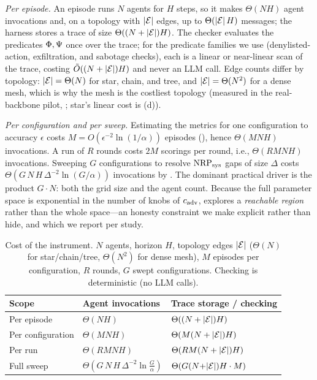 \emph{Per episode.} An episode runs $N$ agents for $H$ steps, so it makes $\Theta(NH)$ agent
invocations and, on a topology with $|\mathcal{E}|$ edges, up to $\Theta(|\mathcal{E}|\,H)$ messages; the
harness stores a trace of size $\Theta((N+|\mathcal{E}|)H)$. The checker evaluates the predicates
$\Phi,\Psi$ once over the trace; for the predicate families we use (denylisted-action,
exfiltration, and sabotage checks), each is a linear or near-linear scan of the trace, costing
$\tilde{O}((N+|\mathcal{E}|)H)$ and never an LLM call. Edge counts differ by topology:
$|\mathcal{E}|=\Theta(N)$ for star, chain, and tree, and $|\mathcal{E}|=\Theta(N^{2})$ for a dense mesh,
which is why the mesh is the costliest topology (measured in the real-backbone pilot,
; star's linear cost is (d)).

\emph{Per configuration and per sweep.} Estimating the metrics for one configuration to accuracy
$\epsilon$ costs $M=O(\epsilon^{-2}\ln(1/\alpha))$ episodes (), hence
$\Theta(MNH)$ invocations. A \corb{} run of $R$ rounds costs $2M$ scorings per round, i.e.,
$\Theta(RMNH)$ invocations. Sweeping $G$ configurations to resolve $\mathrm{NRP}_{\mathrm{sys}}$ gaps of size $\Delta$
costs $\Theta(G\,N\,H\,\Delta^{-2}\ln(G/\alpha))$ invocations by . The dominant
practical driver is the product $G\cdot N$: both the grid size and the agent count. Because the
full parameter space is exponential in the number of knobs of $c_{\mathrm{adv}}$, \corb{}
explores a \emph{reachable region} rather than the whole space---an honesty constraint we make
explicit rather than hide, and which we report per study.

\begin{table}[t]
\centering
\caption{Cost of the  instrument. $N$ agents, horizon $H$, topology edges $|\mathcal{E}|$
($\Theta(N)$ for star/chain/tree, $\Theta(N^2)$ for dense mesh), $M$ episodes per configuration,
$R$ \corb{} rounds, $G$ swept configurations. Checking is deterministic (no LLM calls).}
\label{tab:complexity}
\small
\begin{tabular}{@{}lll@{}}
\toprule
Scope & Agent invocations & Trace storage / checking \\
\midrule
Per episode        & $\Theta(NH)$        & $\Theta((N+|\mathcal{E}|)H)$ \\
Per configuration  & $\Theta(MNH)$       & $\Theta(M(N+|\mathcal{E}|)H)$ \\
Per \corb{} run    & $\Theta(RMNH)$      & $\Theta(RM(N+|\mathcal{E}|)H)$ \\
Full sweep         & $\Theta(G\,N\,H\,\Delta^{-2}\ln\tfrac{G}{\alpha})$ & $\Theta(G(N{+}|\mathcal{E}|)H\cdot M)$ \\
\bottomrule
\end{tabular}
\end{table}
